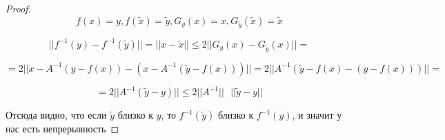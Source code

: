 \begin{theorem} 
\begin{proof}
        \[f(x) = y, f(\tilde{x})=\tilde{y}, G_{y}(x)=x, G_{\tilde{y}}(\tilde{x})=\tilde{x}\]
        
        \[||f^{-1}(y)-f^{-1}(\tilde{y})||=||x-\tilde{x}||\le2||G_{y}(x)-G_{\tilde{y}}(x)|| =  \]
        
        \[= 2||x - A^{-1}(y-f(x))-(x-A^{-1}(\tilde{y}-f(x)))|| = 2 ||A^{-1}(\tilde{y} - f(x) - (y - f(x)))|| =\]
        
        \[= 2||A^{-1}(\tilde{y} - y)|| \le 2||A^{-1}||\text{ }||\tilde{y} - y||\]
        
        Отсюда видно, что если $\tilde{y}$ близко к $y$, то $f^{-1}(\tilde{y})$ близко к $f^{-1}(y)$, и значит у нас есть непрерывность
         
    \end{proof}
    
       
    
   
    
\end{theorem}

